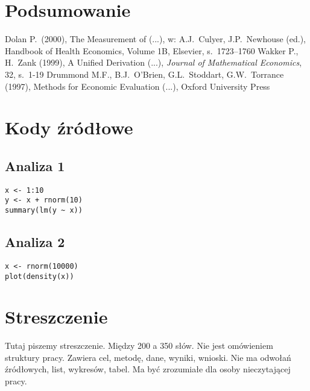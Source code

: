 \documentclass[12pt,a4paper,twoside,openany]{book}
\begin{document}
\clearpage

\chapter{Podsumowanie}

\clearpage
{}
\begin{thebibliography}{99}
\setlength{\itemsep}{0pt}%
 Dolan P.~(2000), The Measurement of (...), w: A.J.~Culyer, J.P.~Newhouse (ed.), Handbook of Health Economics, Volume 1B, Elsevier, s.~1723--1760
 Wakker P., H.~Zank (1999), A Unified Derivation (...), \textit{Journal of  Mathematical Economics}, 32, s.~1-19
 Drummond M.F., B.J.~O'Brien, G.L.~Stoddart, G.W.~Torrance (1997), Methods for Economic Evaluation (...), Oxford University Press
\end{thebibliography}

\clearpage
{}
\listoffigures

\clearpage
\listoftables
{}

\appendix
\chapter*{Kody źródłowe}

\section*{Analiza 1}
\begin{verbatim}
x <- 1:10
y <- x + rnorm(10)
summary(lm(y ~ x))
\end{verbatim}

\section*{Analiza 2}
\begin{verbatim}
x <- rnorm(10000)
plot(density(x))
\end{verbatim}

\clearpage

\chapter*{Streszczenie}

Tutaj piszemy streszczenie. Między 200 a 350 słów. Nie jest omówieniem struktury pracy. Zawiera cel, metodę, dane, wyniki, wnioski. Nie ma odwołań źródłowych, list, wykresów, tabel. Ma być zrozumiałe dla osoby nieczytającej pracy.
\end{document}
